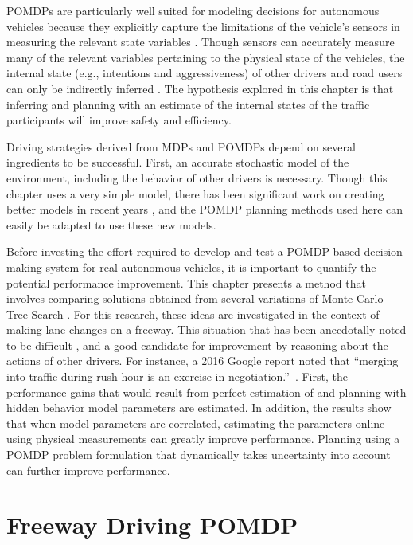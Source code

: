 POMDPs are particularly well suited for modeling decisions for autonomous vehicles because they explicitly capture the limitations of the vehicle's sensors in measuring the relevant state variables \cite{brechtel2013mcvi, sadigh2016gathering, bai2015intention}.
Though sensors can accurately measure many of the relevant variables pertaining to the physical state of the vehicles, the internal state (e.g., intentions and aggressiveness) of other drivers and road users can only be indirectly inferred \cite{sadigh2016gathering, bai2015intention, lam2015, dc2015}.
The hypothesis explored in this chapter is that inferring and planning with an estimate of the internal states of the traffic participants will improve safety and efficiency.

Driving strategies derived from MDPs and POMDPs depend on several ingredients to be successful.
First, an accurate stochastic model of the environment, including the behavior of other drivers is necessary. 
Though this chapter uses a very simple model, there has been significant work on creating better models in recent years \cite{grindele2015trafficmodel, WheelerRobbelKochenderfer2015, sadigh2014}, and the POMDP planning methods used here can easily be adapted to use these new models.

Before investing the effort required to develop and test a POMDP-based decision making system for real autonomous vehicles, it is important to quantify the potential performance improvement.
This chapter presents a method that involves comparing solutions obtained from several variations of Monte Carlo Tree Search \cite{browne2012mcts}.
For this research, these ideas are investigated in the context of making lane changes on a freeway.
This situation that has been anecdotally noted to be difficult \cite{naughton2015freeway}, and a good candidate for improvement by reasoning about the actions of other drivers.
For instance, a 2016 Google report noted that ``merging into traffic during rush hour is an exercise in negotiation.''~\cite{dolgov2016google}.
First, the performance gains that would result from perfect estimation of and planning with hidden behavior model parameters are estimated.
In addition, the results show that when model parameters are correlated, estimating the parameters online using physical measurements can greatly improve performance.
Planning using a POMDP problem formulation that dynamically takes uncertainty into account can further improve performance.

\section{Freeway Driving POMDP} \label{sec:multilanepomdp}

